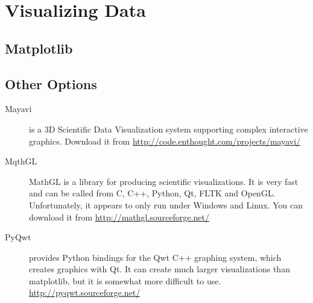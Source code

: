 \chapter{Visualizing Data}
\section{Matplotlib}
\section{Other Options}
\begin{description}
\item[Mayavi] is a 3D Scientific Data Visualization system supporting
  complex interactive graphics. Download it from \url{http://code.enthought.com/projects/mayavi/}
\item[MqthGL] MathGL is a library for producing scientific
  visualizations. It is very fast and can be called from C, C++,
  Python, Qt, FLTK and OpenGL. Unfortunately, it appears to only run
  under Windows and Linux. You can download it from \url{http://mathgl.sourceforge.net/}
\item[PyQwt] provides Python bindings for the Qwt C++ graphing system,
  which creates graphics with Qt. It can create much larger
  visualizations than matplotlib, but it is somewhat more difficult to
  use. \url{http://pyqwt.sourceforge.net/}
\end{description}
